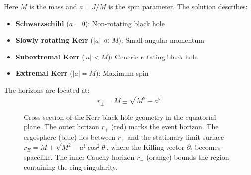 \documentclass[12pt,a4paper]{article}
\begin{document}
Here $M$ is the mass and $a = J/M$ is the spin parameter. The solution describes:
\begin{itemize}
    \item \textbf{Schwarzschild} ($a = 0$): Non-rotating black hole
    \item \textbf{Slowly rotating Kerr} ($|a| \ll M$): Small angular momentum
    \item \textbf{Subextremal Kerr} ($|a| < M$): Generic rotating black hole
    \item \textbf{Extremal Kerr} ($|a| = M$): Maximum spin
\end{itemize}

The horizons are located at:
\begin{equation}
r_\pm = M \pm \sqrt{M^2 - a^2}
\end{equation}

\begin{figure}[htbp]
\centering
{}
\caption{Cross-section of the Kerr black hole geometry in the equatorial plane. The outer horizon $r_+$ (red) marks the event horizon. The ergosphere (blue) lies between $r_+$ and the stationary limit surface $r_E = M + \sqrt{M^2 - a^2\cos^2\theta}$, where the Killing vector $\partial_t$ becomes spacelike. The inner Cauchy horizon $r_-$ (orange) bounds the region containing the ring singularity.}
\label{fig:kerr-geometry}
\end{figure}
\end{document}
